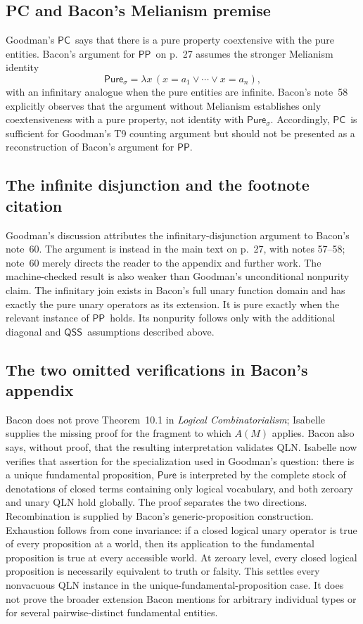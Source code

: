 \documentclass[12pt,leqno]{article}
\newcommand{\OR}{\ensuremath{\vee}}
\theoremstyle{plain}
\theoremstyle{definition}
\newcommand{\Pure}{\ensuremath{\mathsf{Pure}}}
\newcommand{\PP}{\ensuremath{\mathsf{PP}}}
\newcommand{\QSS}{\ensuremath{\mathsf{QSS}}}
\newcommand{\PC}{\ensuremath{\mathsf{PC}}}
\begin{document}
\subsection{PC and Bacon's Melianism premise}

Goodman's \PC\ says that there is a pure property coextensive with the pure
entities.  Bacon's argument for \PP\ on p.~27 assumes the stronger Melianism
identity
\[
 \Pure_{\sigma}
 =
 \lambda x\,(x=a_1\OR\cdots\OR x=a_n),
\]
with an infinitary analogue when the pure entities are infinite.  Bacon's
note~58 explicitly observes that the argument without Melianism establishes
only coextensiveness with a pure property, not identity with
\(\Pure_\sigma\).  Accordingly, \PC\ is sufficient for Goodman's T9 counting
argument but should not be presented as a reconstruction of Bacon's argument
for \PP.

\subsection{The infinite disjunction and the footnote citation}

Goodman's discussion attributes the infinitary-disjunction argument to
Bacon's note~60.  The argument is instead in the main text on p.~27, with
notes 57--58; note~60 merely directs the reader to the appendix and further
work.  The machine-checked result is also weaker than Goodman's unconditional
nonpurity claim.  The infinitary join exists in Bacon's full unary function
domain and has exactly the pure unary operators as its extension.  It is
pure exactly when the relevant instance of \PP\ holds.  Its nonpurity follows
only with the additional diagonal and \QSS\ assumptions described above.

\subsection{The two omitted verifications in Bacon's appendix}

Bacon does not prove Theorem~10.1 in \emph{Logical Combinatorialism}; Isabelle
supplies the missing proof for the fragment to which \(A(M)\) applies.
Bacon also says, without proof, that the resulting interpretation validates
QLN.  Isabelle now verifies that assertion for the specialization used in
Goodman's question: there is a unique fundamental proposition, \(\Pure\) is
interpreted by the complete stock of denotations of closed terms containing
only logical vocabulary, and both zeroary and unary QLN hold globally.  The
proof separates the two directions.  Recombination is supplied by Bacon's
generic-proposition construction.  Exhaustion follows from cone invariance:
if a closed logical unary operator is true of every proposition at a world,
then its application to the fundamental proposition is true at every
accessible world.  At zeroary level, every closed logical proposition is
necessarily equivalent to truth or falsity.  This settles every nonvacuous
QLN instance in the unique-fundamental-proposition case.  It does not prove
the broader extension Bacon mentions for arbitrary individual types or for
several pairwise-distinct fundamental entities.
\end{document}
